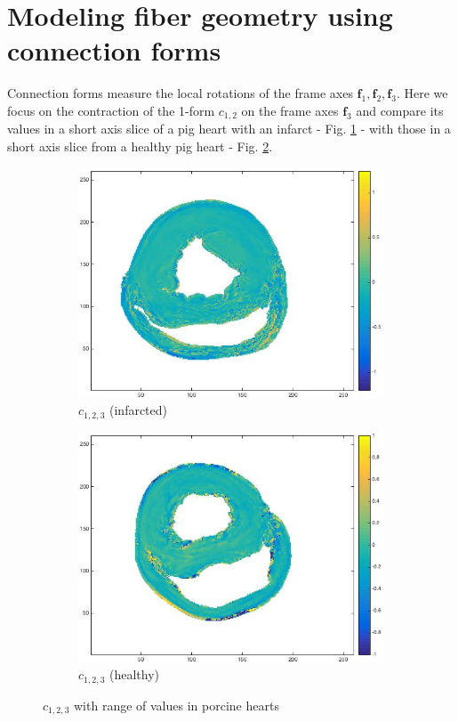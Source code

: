 \section{Modeling fiber geometry using connection forms}

Connection forms measure the local rotations of the frame axes $\mathbf{f}_1, \mathbf{f}_2, \mathbf{f}_3$. Here we focus on the contraction of the 1-form $c_{1,2}$ on the frame axes $\mathbf{f}_3$ and compare its values in a short axis slice of a pig heart with an infarct - Fig. \ref{fig:c123infarcted} - with those in a short axis slice from a healthy pig heart - Fig. \ref{fig:c123healthy}.
\begin{figure}[h!]
    \centering
    \begin{subfigure}[h!]{0.48\textwidth}
        \centering
        \includegraphics[width=\textwidth]{figures/pig4_c123_slice_19}
        \caption{$c_{1,2,3}$ (infarcted)}
        \label{fig:c123infarcted}
    \end{subfigure}
    \hfill
    \begin{subfigure}[h!]{0.48\textwidth}
        \centering
        \includegraphics[width=\textwidth]{figures/pig25_c123_slice_30}
        \caption{$c_{1,2,3}$ (healthy)}
        \label{fig:c123healthy}
    \end{subfigure}
    \caption{$c_{1,2,3}$ with range of values in porcine hearts}
    \label{fig:c123all}
\end{figure}

